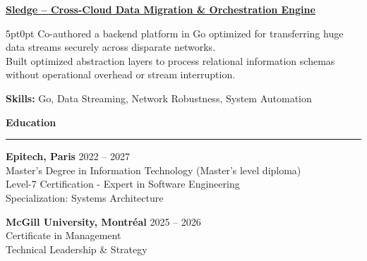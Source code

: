 \documentclass[9pt]{extarticle}
\begin{document}
\underline{\bfseries Sledge -- Cross-Cloud Data Migration \& Orchestration Engine}
\par
\begin{adjustwidth}{5pt}{0pt}
    Co-authored a backend platform in Go optimized for transferring huge data streams securely across disparate networks. \\
    Built optimized abstraction layers to process relational information schemas without operational overhead or stream interruption.
\end{adjustwidth}
\par
{\bfseries Skills:} Go, Data Streaming, Network Robustness, System Automation

\par\vspace{5pt}

{\large\bfseries Education}
\par\vspace{-8pt}
\rule{\linewidth}{0.4pt}
\par\vspace{5pt}

{\bfseries Epitech, Paris} \hfill 2022 -- 2027 \\
Master's Degree in Information Technology (Master's level diploma) \\
Level-7 Certification - Expert in Software Engineering \\
Specialization: Systems Architecture \\

\vspace{4pt}

{\bfseries McGill University, Montréal} \hfill 2025 -- 2026 \\
Certificate in Management \\
Technical Leadership \& Strategy
\end{document}
